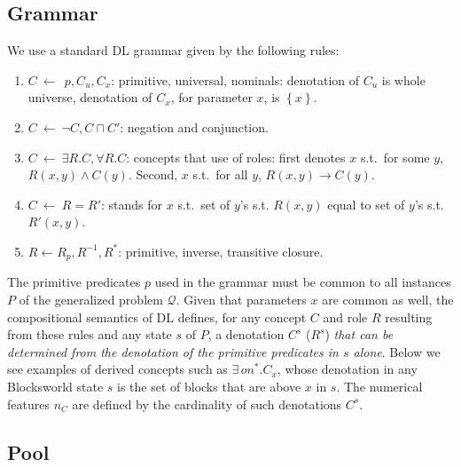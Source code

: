 \documentclass[letterpaper]{article} %
\newcommand{\set}[1]{\ensuremath{\left\{#1 \right\}}}
\newcommand{\Q}{\mathcal{Q}}
\begin{document}
\subsection{Grammar}

We use a standard  DL grammar given by the following rules:
\begin{enumerate}[{\small$\bullet$}]
  \item $C \ \leftarrow\ \ p, C_u, C_x$: primitive, universal, nominals: denotation of $C_u$ is whole universe, denotation of $C_x$, for parameter $x$, is $\set{x}$.
  \item $C \ \leftarrow\  \neg C, C \sqcap C'$: negation and conjunction.
  \item $C \ \leftarrow\  \exists R.C , \forall R.C$: concepts that use of  roles: first denotes $x$ s.t.\ for some  $y$,  $R(x,y) \land C(y)$.
  Second,  $x$ s.t.\ for all $y$, $R(x,y) \rightarrow C(y)$.
  \item $C \ \leftarrow\  R=R'$: stands for $x$ s.t.\ set of $y$'s  s.t. $R(x,y)$ equal to set of $y$'s s.t. $R'(x,y)$.
  \item $R \leftarrow R_p, R^{-1}, R^*$: primitive, inverse, transitive closure.
 \end{enumerate}

The primitive predicates $p$ used in the grammar must be common to all instances $P$ of the generalized problem $\Q$.
Given that parameters $x$ are common as well,
the compositional semantics of DL defines, for any concept $C$ and role $R$ resulting
from these rules and any state $s$ of $P$, a denotation $C^s$ ($R^s$)
\emph{that can be determined from the denotation of the primitive predicates in $s$ alone}.
Below we see examples of derived concepts such as $\exists\, on^* . C_x$, whose denotation
in any Blocksworld state $s$ is the set of blocks that are above $x$ in $s$.
The numerical features $n_C$ are defined by the cardinality of such denotations $C^s$. 


\subsection{Pool}
\end{document}
